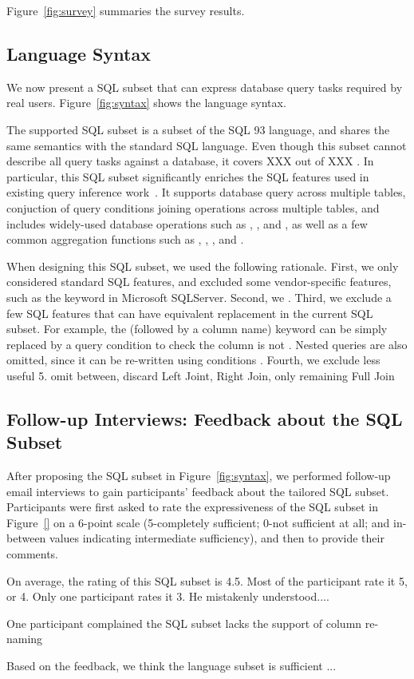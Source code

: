 Figure~\ref{fig:survey} summaries the survey results.

\subsection{Language Syntax}
\label{sec:syntax}

We now present a SQL subset that can express database query
tasks required by real users. Figure~\ref{fig:syntax} shows
the language syntax.


The supported SQL subset is a subset of the SQL 93
language, and shares the same semantics with the standard
SQL language.  Even though this subset cannot describe all query
tasks against a database, it covers XXX out of XXX 
. In particular, this SQL subset significantly
enriches the SQL features used in existing query inference
work~\cite{DasSarma:2010}.  It supports database query
across multiple tables, conjuction of query conditions
joining operations across multiple tables, and includes
widely-used database operations such as ,
, and , as
well as a few common aggregation functions such as , ,
, and .

When designing this SQL subset, we used the following rationale.
First, we only considered standard SQL features, and excluded
some vendor-specific features, such as the  keyword
in Microsoft SQLServer. Second, we . Third, we exclude
a few SQL features that can have equivalent replacement 
in the current SQL subset. For example, the  (followed
by a column name) keyword can be simply replaced by a
query condition to check the column is not .
Nested queries are also omitted, since it can be re-written
using conditions .
Fourth, we exclude less useful
5. omit between, discard Left Joint, Right Join, only remaining Full Join



\subsection{Follow-up Interviews: Feedback about the SQL Subset}
\label{sec:interview}

After proposing the SQL subset in Figure~\ref{fig:syntax},
we performed follow-up email interviews to gain
participants' feedback about the tailored SQL
subset. Participants were first asked to rate
the expressiveness of the SQL subset in Figure~\ref{}
on a 6-point scale (5-completely sufficient; 0-not sufficient at all;
and in-between values indicating intermediate sufficiency),
and then to provide their comments.

On average, the rating of this SQL subset is 4.5. Most of
the participant rate it 5, or 4. Only one participant rates
it 3. He mistakenly understood....\todo{}

One participant complained the SQL subset lacks the support
of column re-naming

Based on the feedback, we think the language subset is
sufficient ...
